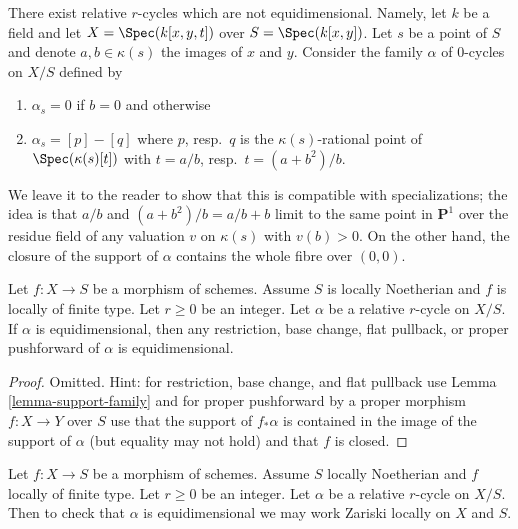 \begin{example}
\label{example-not-equidimensional}
\begin{reference}
\cite[Example 3.1.9]{SV}
\end{reference}
There exist relative $r$-cycles which are not equidimensional.
Namely, let $k$ be a field and let $X = \Spec(k[x, y, t])$
over $S = \Spec(k[x, y])$. Let $s$ be a point of $S$ and
denote $a, b \in \kappa(s)$ the images of $x$ and $y$.
Consider the family $\alpha$ of $0$-cycles on $X/S$ defined by
\begin{enumerate}
\item $\alpha_s = 0$ if $b = 0$ and otherwise
\item $\alpha_s = [p] - [q]$ where $p$, resp.\ $q$ is the $\kappa(s)$-rational
point of $\Spec(\kappa(s)[t])$ with $t = a/b$,
resp.\ $t = (a + b^2)/b$.
\end{enumerate}
We leave it to the reader to show that this is compatible with specializations;
the idea is that $a/b$ and $(a + b^2)/b = a/b + b$ limit to the same point
in $\mathbf{P}^1$ over the residue field of any valuation $v$ on $\kappa(s)$
with $v(b) > 0$. On the other hand, the closure of the support of $\alpha$
contains the whole fibre over $(0, 0)$.
\end{example}

\begin{lemma}
\label{lemma-equidimensional-functoriality}
Let $f : X \to S$ be a morphism of schemes. Assume $S$ is locally Noetherian
and $f$ is locally of finite type. Let $r \geq 0$ be an integer. Let
$\alpha$ be a relative $r$-cycle on $X/S$. If $\alpha$ is equidimensional,
then any restriction, base change, flat pullback, or proper pushforward
of $\alpha$ is equidimensional.
\end{lemma}

\begin{proof}
Omitted. Hint: for restriction, base change, and flat pullback use
Lemma \ref{lemma-support-family} and for proper pushforward by
a proper morphism $f : X \to Y$ over $S$ use
that the support of $f_*\alpha$ is contained in the image of the
support of $\alpha$ (but equality may not hold) and that $f$
is closed.
\end{proof}

\begin{lemma}
\label{lemma-check-equidimensional}
Let $f : X \to S$ be a morphism of schemes. Assume $S$ locally Noetherian
and $f$ locally of finite type. Let $r \geq 0$ be an integer. Let $\alpha$
be a relative $r$-cycle on $X/S$. Then to check that $\alpha$ is equidimensional
we may work Zariski locally on $X$ and $S$.
\end{lemma}

